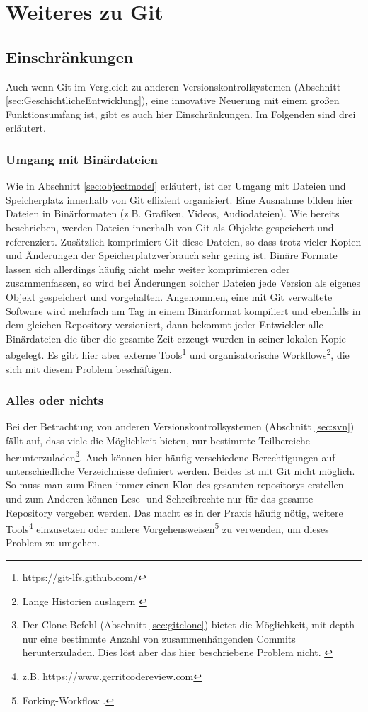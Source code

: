 \chapter{Weiteres zu Git}\label{cha:somethingmore}
\section{Einschränkungen}\label{sec:problems}
Auch wenn Git im Vergleich zu anderen Versionskontrollsystemen (Abschnitt
\ref{sec:GeschichtlicheEntwicklung}), eine innovative Neuerung mit einem großen
Funktionsumfang ist, gibt es auch hier Einschränkungen. Im Folgenden sind drei
erläutert.

\subsection{Umgang mit Binärdateien}\label{sec:binaries}
Wie in Abschnitt \ref{sec:objectmodel} erläutert, ist der Umgang mit Dateien
und Speicherplatz innerhalb von Git effizient organisiert. Eine Ausnahme bilden
hier Dateien in Binärformaten (z.B.  Grafiken, Videos, Audiodateien). Wie
bereits beschrieben, werden Dateien innerhalb von Git als Objekte gespeichert
und referenziert.  Zusätzlich komprimiert Git diese Dateien, so dass trotz
vieler Kopien und Änderungen der Speicherplatzverbrauch sehr gering ist. Binäre
Formate lassen sich allerdings häufig nicht mehr weiter komprimieren oder
zusammenfassen, so wird bei Änderungen solcher Dateien jede Version als eigenes
Objekt gespeichert und vorgehalten. Angenommen, eine mit Git verwaltete
Software wird mehrfach am Tag in einem Binärformat kompiliert und ebenfalls in
dem gleichen Repository versioniert, dann bekommt jeder Entwickler alle
Binärdateien die über die gesamte Zeit erzeugt wurden in seiner lokalen Kopie
abgelegt.  Es gibt hier aber externe
Tools\footnote{https://git-lfs.github.com/} und organisatorische
Workflows\footnote{Lange Historien auslagern \cite[S.~235-244]{gitwf}}, die
sich mit diesem Problem beschäftigen.  \cite[S.~300]{gitwf}

\subsection{Alles oder nichts}
Bei der Betrachtung von anderen Versionskontrollsystemen (Abschnitt
\ref{sec:svn}) fällt auf, dass viele die Möglichkeit bieten, nur bestimmte
Teilbereiche herunterzuladen\footnote{Der Clone Befehl (Abschnitt
\ref{sec:gitclone}) bietet die Möglichkeit, mit \-{}\-{}depth nur eine
bestimmte Anzahl von zusammenhängenden Commits herunterzuladen. Dies löst aber das
hier beschriebene Problem nicht. \cite[S.~244]{gitwf}}. Auch können hier
häufig verschiedene Berechtigungen auf unterschiedliche Verzeichnisse definiert
werden.  Beides ist mit Git nicht möglich. So muss man zum Einen immer einen
Klon des gesamten \glspl{repository} erstellen und zum Anderen können Lese- und
Schreibrechte nur für das gesamte Repository vergeben werden. Das macht es in
der Praxis häufig nötig, weitere Tools\footnote{z.B.
https://www.gerritcodereview.com} einzusetzen oder andere
Vorgehensweisen\footnote{Forking-Workflow \cite[S.~163-173]{gitwf}.} zu
verwenden, um dieses Problem zu umgehen. \cite[300-302]{gitwf}


